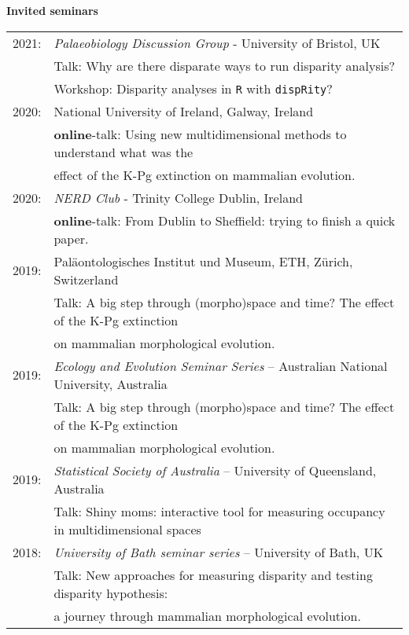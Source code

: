 \documentclass[10pt,a4paper]{article}
\begin{document}
{\raggedright\textbf{Invited seminars}\\[1.5ex]
\begin{tabular}{ll}
2021: & \textit{Palaeobiology Discussion Group} - University of Bristol, UK\\
      & Talk: Why are there disparate ways to run disparity analysis?\\
      & Workshop: Disparity analyses in \texttt{R} with \texttt{dispRity}?\\ 
2020: & National University of Ireland, Galway, Ireland\\
      & \textbf{online}-talk: Using new multidimensional methods to understand what was the\\
      & effect of the K-Pg extinction on mammalian evolution.\\
2020: & \textit{NERD Club} - Trinity College Dublin, Ireland\\
      & \textbf{online}-talk: From Dublin to Sheffield: trying to finish a quick paper.\\
2019: & Pal\"{a}ontologisches Institut und Museum, ETH, Z\"{u}rich, Switzerland\\
      & Talk: A big step through (morpho)space and time? The effect of the K-Pg extinction\\
      & on mammalian morphological evolution.\\
2019: & \textit{Ecology and Evolution Seminar Series} – Australian National University, Australia\\
      & Talk: A big step through (morpho)space and time? The effect of the K-Pg extinction\\
      & on mammalian morphological evolution.\\
2019: & \textit{Statistical Society of Australia} – University of Queensland, Australia\\
      & Talk: Shiny moms: interactive tool for measuring occupancy in multidimensional spaces\\
2018: & \textit{University of Bath seminar series} – University of Bath, UK\\
      & Talk: New approaches for measuring disparity and testing disparity hypothesis:\\
      & a journey through mammalian morphological evolution.\\

\end{tabular}}
\end{document}
